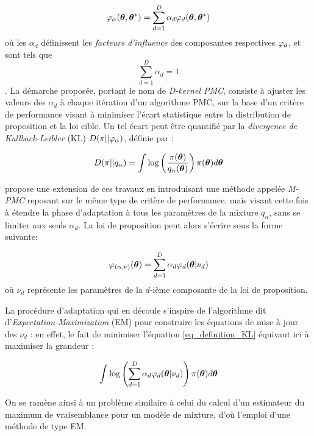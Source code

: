 \begin{equation}
{\varphi}_\alpha({\bm{\theta}}, {{\bm{\theta}}^*}) = \sum\limits_{d=1}^D\alpha_d {\varphi}_d({\bm{\theta}}, {{\bm{\theta}}^*})
\label{eq_PMC_D_Kernel}
\end{equation}
où les $\alpha_d$ définissent les \textit{facteurs d'influence} des composantes respectives ${\varphi}_d$, et sont tels que $$\sum\limits_{d=1}^D \alpha_d = 1$$. La démarche proposée, portant le nom de \textit{D-kernel PMC}, consiste à ajuster les valeurs des $\alpha_d$ à chaque itération d'un algorithme PMC, sur la base d'un critère de performance visant à minimiser l'écart statistique entre la distribution de proposition et la loi cible. Un tel écart peut être quantifié par la \textit{divergence de Kullback-Leibler} (KL)  $D(\pi || {\varphi}_\alpha )$, définie par : 


\begin{equation}
D(\pi || q_\alpha ) = \int \log\left(\dfrac{\pi({\bm{\theta}})}{q_\alpha({\bm{\theta}})}\right)\pi({\bm{\theta}})d{\bm{\theta}}
\label{eq_definition_KL}
\end{equation}

\cite{Cappe2008} propose une extension de ces travaux en introduisant une méthode appelée \textit{M-PMC} reposant sur le même type de critère de performance, mais visant cette fois à étendre la phase d'adaptation à tous les paramètres de la mixture $q_\alpha$, sans se limiter aux seuls $\alpha_d$. La loi de proposition peut alors s'écrire sous la forme suivante:

\begin{equation}
{\varphi}_{(\alpha,\nu)}({\bm{\theta}}) = \sum\limits_{d=1}^D\alpha_d {\varphi}_d({\bm{\theta}} |\nu_d)
\label{eq_M_PMC_kernel}
\end{equation}
où $\nu_d$ représente les paramètres de la $d$-ième composante de la loi de proposition.

La procédure d'adaptation qui en découle s'inspire de l'algorithme dit d'\textit{Expectation-Maximization} (EM) pour construire les équations de mise à jour des $\nu_d$ : en effet, le fait de minimiser l'équation \eqref{eq_definition_KL} équivaut ici  à maximiser la grandeur : 

\begin{equation}
\int \log\left(\sum\limits_{d=1}^D \alpha_d {\varphi}_d({\bm{\theta}}| \nu_d)\right)\pi({\bm{\theta}})d{\bm{\theta}}
\label{eq_KL_pour_EM}
\end{equation} 

On se ramène ainsi à un problème similaire à celui du calcul d'un estimateur du maximum de vraisemblance pour un modèle de mixture, d'où l'emploi d'une méthode de type EM. 

